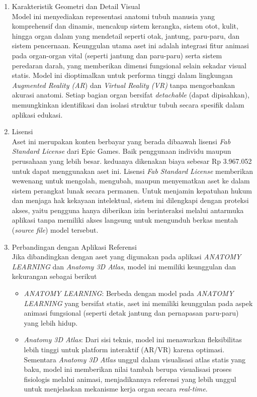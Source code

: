         \begin{enumerate}
            \item Karakteristik Geometri dan Detail Visual\\
            Model ini menyediakan representasi anatomi tubuh manusia yang komprehensif dan dinamis, mencakup sistem kerangka, sistem otot, kulit, hingga organ dalam yang mendetail seperti otak, jantung, paru-paru, dan sistem pencernaan. Keunggulan utama aset ini adalah integrasi fitur animasi pada organ-organ vital (seperti jantung dan paru-paru) serta sistem peredaran darah, yang memberikan dimensi fungsional selain sekadar visual statis. Model ini dioptimalkan untuk performa tinggi dalam lingkungan \textit{Augmented Reality (AR}) dan \textit{Virtual Reality (VR)} tanpa mengorbankan akurasi anatomi. Setiap bagian organ bersifat \textit{detachable} (dapat dipisahkan), memungkinkan identifikasi dan isolasi struktur tubuh secara spesifik dalam aplikasi edukasi.

            \item Lisensi\\
            Aset ini merupakan konten berbayar yang berada dibaawah lisensi\textit{ Fab Standard License} dari Epic Games. Baik penggunaan individu maupun perusahaan yang lebih besar. keduanya dikenakan biaya sebesar Rp 3.967.052 untuk dapat menggunakan aset ini. Lisensi \textit{ Fab Standard License} memberikan wewenang untuk mengolah, mengubah, maupun menyematkan aset ke dalam sistem perangkat lunak secara permanen. Untuk menjamin kepatuhan hukum dan menjaga hak kekayaan intelektual, sistem ini dilengkapi dengan proteksi akses, yaitu pengguna hanya diberikan izin berinteraksi melalui antarmuka aplikasi tanpa memiliki akses langsung untuk mengunduh berkas mentah (\textit{source file}) model tersebut.
        
            \item Perbandingan dengan Aplikasi Referensi\\
            Jika dibandingkan dengan aset yang digunakan pada aplikasi \textit{ANATOMY LEARNING} dan \textit{Anatomy 3D Atlas}, model ini memiliki keunggulan dan kekurangan sebagai berikut 
            \begin{itemize}
                \item \textit{ANATOMY LEARNING}: Berbeda dengan model pada \textit{ANATOMY LEARNING} yang bersifat statis, aset ini memiliki keunggulan pada aspek animasi fungsional (seperti detak jantung dan pernapasan paru-paru) yang lebih hidup.
                
                \item \textit{Anatomy 3D Atlas}: Dari sisi teknis, model ini menawarkan fleksibilitas lebih tinggi untuk platform interaktif (AR/VR) karena optimasi. Sementara \textit{Anatomy 3D Atlas} unggul dalam visualisasi atlas statis yang baku, model ini memberikan nilai tambah berupa visualisasi proses fisiologis melalui animasi, menjadikannya referensi yang lebih unggul untuk menjelaskan mekanisme kerja organ secara \textit{real-time}.
            \end{itemize}
        \end{enumerate}
        
